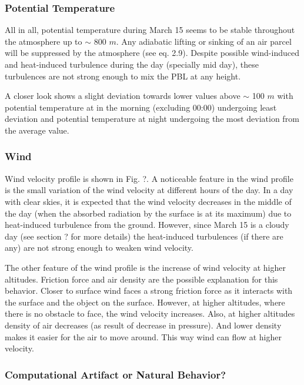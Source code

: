\documentclass[a4paper,12pt]{article}
\numberwithin{equation}{section} %
\begin{document}
\subsubsection{Potential Temperature}

All in all, potential temperature during March 15 seems to be stable throughout the atmosphere up to $\sim$ 800 $m$. Any adiabatic lifting or sinking of an air parcel will be suppressed by the atmosphere (see eq. 2.9). Despite possible wind-induced and heat-induced turbulence during the day (specially mid day), these turbulences are not strong enough to mix the PBL at any height.


A closer look shows a slight deviation towards lower values above $\sim$ 100 $m$ with potential temperature at in the morning (excluding 00:00) undergoing least deviation and potential temperature at night undergoing the most deviation from the average value.


\subsubsection{Wind}

Wind velocity profile is shown in Fig. ?. A noticeable feature in the wind profile is the small variation of the wind velocity at different hours of the day. In a day with clear skies, it is expected that the wind velocity decreases in the middle of the day (when the absorbed radiation by the surface is at its maximum) due to heat-induced turbulence from the ground. However, since March 15 is a cloudy day (see section ? for more details) the heat-induced turbulences (if there are any) are not strong enough to weaken wind velocity. 

The other feature of the wind profile is the increase of wind velocity at higher altitudes. Friction force and air density are the possible explanation for this behavior. Closer to surface wind faces a strong friction force as it interacts with the surface and the object on the surface. However, at higher altitudes, where there is no obstacle to face, the wind velocity increases. Also, at higher altitudes density of air decreases (as result of decrease in pressure). And lower density makes it easier for the air to move around. This way wind can flow at higher velocity.

\subsubsection{Computational Artifact or Natural Behavior?}
\end{document}

